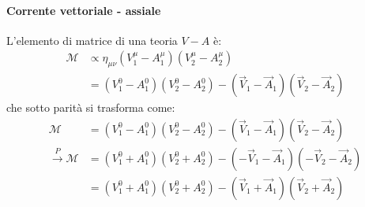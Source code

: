 \documentclass{subnucbo}
\begin{document}
\paragraph{Corrente vettoriale - assiale} L'elemento di matrice di una teoria $V-A$ è:
\begin{equation}
        \begin{aligned}
                \mathcal{M} & \propto \eta _ { \mu \nu } \left( V _ { 1 } ^ { \mu } - A _ { 1 } ^ { \mu } \right) \left( V _ { 2 } ^ { \mu } - A _ { 2 } ^ { \mu } \right) \\ & = \left( V _ { 1 } ^ { 0 } - A _ { 1 } ^ { 0 } \right) \left( V _ { 2 } ^ { 0 } - A _ { 2 } ^ { 0 } \right) - \left( \vec { V } _ { 1 } - \vec { A } _ { 1 } \right) \left( \vec { V } _ { 2 } - \vec { A } _ { 2 } \right)
        \end{aligned}
\end{equation}
che sotto parità si trasforma come:
\begin{equation}
        \begin{aligned}
                \mathcal{M} & = \left( V _ { 1 } ^ { 0 } - A _ { 1 } ^ { 0 } \right) \left( V _ { 2 } ^ { 0 } - A _ { 2 } ^ { 0 } \right) - \left( \vec { V } _ { 1 } - \vec { A } _ { 1 } \right) \left( \vec { V } _ { 2 } - \vec { A } _ { 2 } \right) \\ \stackrel { P } { \longrightarrow } \mathcal{M} & = \left( V _ { 1 } ^ { 0 } + A _ { 1 } ^ { 0 } \right) \left( V _ { 2 } ^ { 0 } + A _ { 2 } ^ { 0 } \right) - \left( - \vec { V } _ { 1 } - \vec { A } _ { 1 } \right) \left( - \vec { V } _ { 2 } - \vec { A } _ { 2 } \right) \\ & = \left( V _ { 1 } ^ { 0 } + A _ { 1 } ^ { 0 } \right) \left( V _ { 2 } ^ { 0 } + A _ { 2 } ^ { 0 } \right) - \left( \vec { V } _ { 1 } + \vec { A } _ { 1 } \right) \left( \vec { V } _ { 2 } + \vec { A } _ { 2 } \right)
        \end{aligned}
\end{equation}
\end{document}
